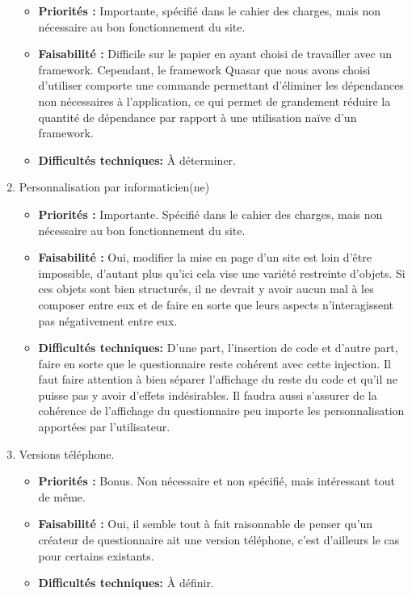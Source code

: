 \documentclass{article}
\begin{document}
\begin{enumerate}[noitemsep]
\begin{itemize}[noitemsep]
\item \textbf{Priorités : }Importante, spécifié dans le cahier des charges, mais non nécessaire au bon fonctionnement du site.
\item \textbf{Faisabilité : } Difficile sur le papier en ayant choisi de travailler avec un framework. Cependant, le framework Quasar que nous avons choisi d'utiliser comporte une commande permettant d'éliminer les dépendances non nécessaires à l'application, ce qui permet de grandement réduire la quantité de dépendance par rapport à une utilisation naïve d'un framework.
\item \textbf{Difficultés techniques: } À déterminer.
\end{itemize}
\item Personnalisation par informaticien(ne)
\begin{itemize}[noitemsep]
\item \textbf{Priorités : }Importante. Spécifié dans le cahier des charges, mais non nécessaire au bon fonctionnement du site.
\item \textbf{Faisabilité : }Oui, modifier la mise en page d'un site est loin d'être impossible, d'autant plus qu'ici cela vise une variété restreinte d'objets. Si ces objets sont bien structurés, il ne devrait y avoir aucun mal à les composer entre eux et de faire en sorte que leurs aspects n'interagissent pas négativement entre eux.
\item \textbf{Difficultés techniques: } D'une part, l'insertion de code et d'autre part, faire en sorte que le questionnaire reste cohérent avec cette injection. Il faut faire attention à bien séparer l'affichage du reste du code et qu'il ne puisse pas y avoir d'effets indésirables. Il faudra aussi s'assurer de la cohérence de l'affichage du questionnaire peu importe les personnalisation apportées par l'utilisateur.
\end{itemize}
\newpage
\item Versions téléphone.
\begin{itemize}[noitemsep]
\item \textbf{Priorités : }Bonus. Non nécessaire et non spécifié, mais intéressant tout de même.
\item \textbf{Faisabilité : } Oui, il semble tout à fait raisonnable de penser qu'un créateur de questionnaire ait une version téléphone, c'est d'ailleurs le cas pour certains existants.
\item \textbf{Difficultés techniques: } À définir.
\end{itemize}
\end{enumerate}
\end{document}
